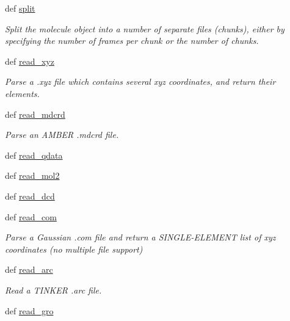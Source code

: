 \begin{DoxyCompactItemize}
def \hyperlink{classforcebalance_1_1molecule_1_1Molecule_a71da1c1e530afd8b9b5f08d9bd27259f}{split}
\begin{DoxyCompactList}\small\item\em Split the molecule object into a number of separate files (chunks), either by specifying the number of frames per chunk or the number of chunks. \end{DoxyCompactList}\item 
def \hyperlink{classforcebalance_1_1molecule_1_1Molecule_a15a7a0e0377e6dfd52e60c77fbc583c1}{read\-\_\-xyz}
\begin{DoxyCompactList}\small\item\em Parse a .xyz file which contains several xyz coordinates, and return their elements. \end{DoxyCompactList}\item 
def \hyperlink{classforcebalance_1_1molecule_1_1Molecule_ab1b56d66b7673b2631e2cee013a80b93}{read\-\_\-mdcrd}
\begin{DoxyCompactList}\small\item\em Parse an A\-M\-B\-E\-R .mdcrd file. \end{DoxyCompactList}\item 
def \hyperlink{classforcebalance_1_1molecule_1_1Molecule_a1d34af6a7d22dd34850d58efe8595b20}{read\-\_\-qdata}
\item 
def \hyperlink{classforcebalance_1_1molecule_1_1Molecule_a14b1fbc70a083d21fd016b5dd854fd56}{read\-\_\-mol2}
\item 
def \hyperlink{classforcebalance_1_1molecule_1_1Molecule_ad8fa6cc7424aae00ee3f5bb87d28e037}{read\-\_\-dcd}
\item 
def \hyperlink{classforcebalance_1_1molecule_1_1Molecule_a861feda06e1f60ab25c45eaaaf228cfc}{read\-\_\-com}
\begin{DoxyCompactList}\small\item\em Parse a Gaussian .com file and return a S\-I\-N\-G\-L\-E-\/\-E\-L\-E\-M\-E\-N\-T list of xyz coordinates (no multiple file support) \end{DoxyCompactList}\item 
def \hyperlink{classforcebalance_1_1molecule_1_1Molecule_aeb5983ae61079198f077f55e448e2c32}{read\-\_\-arc}
\begin{DoxyCompactList}\small\item\em Read a T\-I\-N\-K\-E\-R .arc file. \end{DoxyCompactList}\item 
def \hyperlink{classforcebalance_1_1molecule_1_1Molecule_a963a4382dc59ebd8dd9ee2064843e355}{read\-\_\-gro}

\end{DoxyCompactItemize}
